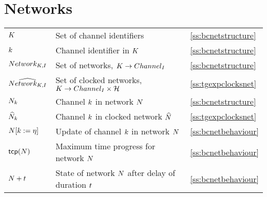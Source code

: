 {\section*{Networks}
\begin{tabular}{l>{\raggedright}p{.5\linewidth}<{}l}
${K}$ & Set of channel identifiers &  \ref{ss:bcnetstructure} \\
${k}$ & Channel identifier in ${K}$ & \ref{ss:bcnetstructure} \\
${Network_{{K},I}}$ & Set of networks, ${K} \rightarrow {Channel_{I}}$ & \ref{ss:bcnetstructure} \\
$\widehat{Network_{{K},I}}$ & Set of clocked networks, $\K \fun \Channel{\I}\cross \clocks$ & \ref{ss:tgexpclocksnet} \\
${N}_{k}$ & Channel ${k}$ in network ${N}$ & \ref{ss:bcnetstructure} \\
${\widehat{N}}_{k}$ & Channel ${k}$ in clocked network ${\widehat{N}}$ & \ref{ss:tgexpclocksnet} \\
${N}[{k}\mathrel{:=}\eta]$ & Update of channel ${k}$ in network ${N}$ & \ref{ss:bcnetbehaviour} \\
${\mathop{\sf tcp}}({N})$ & Maximum time progress for network ${N}$ & \ref{ss:bcnetbehaviour} \\
${N} + {t}$ & State of network ${N}$ after delay of duration ${t}$ & \ref{ss:bcnetbehaviour} \\
\end{tabular}
\vfil

}
